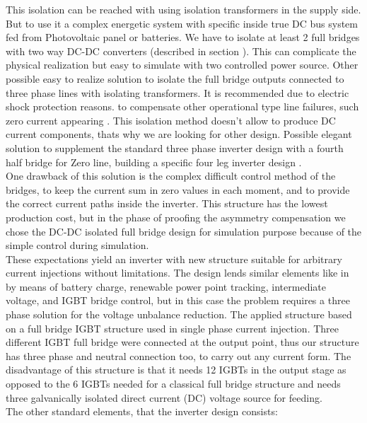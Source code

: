     This isolation can be reached  with using isolation transformers in the supply side. But  to use it a complex energetic system with specific inside true DC bus system fed from Photovoltaic panel or batteries. We have to isolate at least 2 full bridges with two way DC-DC converters (described in section ). This can complicate the physical realization but easy to simulate with two controlled power source. Other possible easy to realize solution to isolate the full bridge outputs  connected to three phase lines with isolating transformers. It is recommended due to electric shock protection reasons.  to compensate other operational type line failures, such zero current appearing . This isolation method doesn't allow to produce DC current components, thats why we are looking for other design. Possible elegant solution to supplement the standard three phase inverter design with a fourth half bridge for Zero line, building a specific four leg inverter design \cite{Ninad2014control}.\\
    One drawback of this solution is the complex difficult control method of the bridges, to keep the current sum in zero values in each moment, and to provide the correct current paths inside the inverter. This structure has the lowest production cost, but in the phase of proofing the asymmetry compensation we chose the DC-DC isolated  full bridge design for simulation purpose because of the simple control during simulation.\\
     These expectations yield an inverter with new structure suitable for arbitrary current injections without limitations. The design lends similar elements like in \cite{gorbe2012reduction} by means of battery charge, renewable power point tracking, intermediate voltage, and IGBT bridge control, but in this case the problem requires a three phase solution for the voltage unbalance reduction. The applied structure based on a full bridge IGBT structure used in single phase current injection. Three different IGBT full bridge were connected at the output point, thus our structure has three phase and neutral connection too, to carry out any current form. The disadvantage of this structure is that it needs 12 IGBTs in the output stage as opposed to the 6 IGBTs needed for a classical full bridge structure and needs three galvanically isolated direct current (DC) voltage source for feeding.\\
    The other standard elements, that the inverter design consists:

